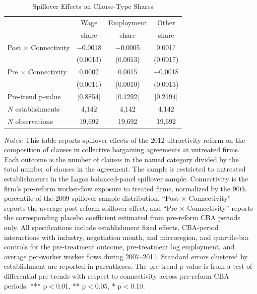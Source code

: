 \begin{table}[!htbp]
\centering
\caption{Spillover Effects on Clause-Type Shares}
\label{tab:clause_prop_spill}
\scriptsize
\begin{tabular}{lccc}
\toprule
 & Wage & Employment & Other \\
 & share & share & share \\
\midrule
Post $\times$ Connectivity & $-$0.0018 & $-$0.0005 & 0.0017\\
 & (0.0013) & (0.0013) & (0.0017)\\
Pre $\times$ Connectivity & 0.0002 & 0.0015 & $-$0.0018\\
 & (0.0011) & (0.0010) & (0.0013)\\
Pre-trend p-value & [0.8854] & [0.1292] & [0.2194]\\
$N$ establishments & 4{,}142 & 4{,}142 & 4{,}142\\
$N$ observations & 19{,}692 & 19{,}692 & 19{,}692\\
\bottomrule
\end{tabular}
\begin{minipage}{\linewidth}
\footnotesize\vspace{4pt}
\textit{Notes:} This table reports spillover effects of the 2012 ultractivity reform on the composition of clauses in collective bargaining agreements at untreated firms. Each outcome is the number of clauses in the named category divided by the total number of clauses in the agreement. The sample is restricted to untreated establishments in the Lagos balanced-panel spillover sample. Connectivity is the firm's pre-reform worker-flow exposure to treated firms, normalized by the 90th percentile of the 2009 spillover-sample distribution. ``Post $\times$ Connectivity'' reports the average post-reform spillover effect, and ``Pre $\times$ Connectivity'' reports the corresponding placebo coefficient estimated from pre-reform CBA periods only. All specifications include establishment fixed effects, CBA-period interactions with industry, negotiation month, and microregion, and quartile-bin controls for the pre-treatment outcome, pre-treatment log employment, and average per-worker worker flows during 2007--2011. Standard errors clustered by establishment are reported in parentheses. The pre-trend p-value is from a test of differential pre-trends with respect to connectivity across pre-reform CBA periods. *** p$<$0.01, ** p$<$0.05, * p$<$0.10.
\end{minipage}
\end{table}
